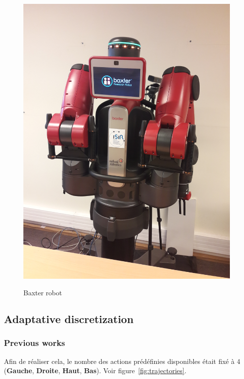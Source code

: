 \documentclass{llncs}
\begin{document}
\begin{figure}
	\centering
	\includegraphics[angle=-90,width=.5\textwidth]{figures/baxter}
	\label{fig:baxter}
	\caption{Baxter robot}
\end{figure}


\subsection{Adaptative discretization}

\subsubsection{Previous works}

Afin de réaliser cela, le nombre des actions prédéfinies disponibles était fixé à 4 (\textbf{Gauche}, \textbf{Droite}, \textbf{Haut}, \textbf{Bas}). Voir figure~\ref{fig:trajectories}.
\end{document}
